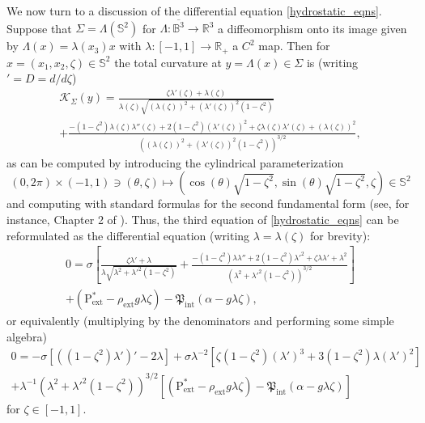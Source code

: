 \documentclass[11pt,reqno]{amsart}
\numberwithin{equation}{section}
\newcommand{\m}{\mathrm}
\def\pfint{\mathfrak{P}_{\m{int}}}
\def\pext{\m{P}_{\m{ext}}}
\def\R{\mathbb{R}}
\begin{document}
We now turn to a discussion of the differential equation \eqref{hydrostatic_eqns}. %
Suppose that $\Sigma = \Lambda(\mathbb{S}^2)$ for $\Lambda : \overline{\mathbb{B}^3} \to \R^3$ a diffeomorphism onto its image given by  $\Lambda(x) = \lambda(x_3) x$  with $\lambda : [-1,1] \to \R_+$   a $C^2$ map.    Then for $x= (x_1,x_2,\zeta) \in \mathbb{S}^2$ the total curvature at $y=\Lambda(x) \in \Sigma$ is (writing $' = D = d/d\zeta$)
\begin{multline}
 \mathscr{K}_{\Sigma}(y) =    \frac{ \zeta \lambda'(\zeta) + \lambda(\zeta)}{\lambda(\zeta)  \sqrt{  (\lambda(\zeta))^2 + (\lambda'(\zeta))^2 (1-\zeta^2)  }}  \\
+ \frac{- (1-\zeta^2) \lambda(\zeta) \lambda''(\zeta) + 2(1-\zeta^2) (\lambda'(\zeta))^2 + \zeta \lambda(\zeta) \lambda'(\zeta) + (\lambda(\zeta))^2}{(  (\lambda(\zeta))^2 + (\lambda'(\zeta))^2 (1-\zeta^2)  )^{3/2}},
\end{multline}
as can be computed by introducing the cylindrical parameterization 
\begin{equation}
 (0,2\pi) \times (-1,1) \ni (\theta,\zeta) \mapsto  (\cos(\theta) \sqrt{1-\zeta^2}, \sin(\theta) \sqrt{1-\zeta^2}, \zeta) \in \mathbb{S}^2
\end{equation}
and computing with standard formulas for the second fundamental form (see, for instance, Chapter 2 of \cite{Spivak_1979}).  Thus, the third equation of \eqref{hydrostatic_eqns} can be reformulated as the differential equation (writing $\lambda = \lambda(\zeta)$ for brevity):  
\begin{multline}
 0 = \sigma \left[ \frac{\zeta \lambda' + \lambda}{\lambda  \sqrt{  \lambda^2 + \lambda'^2 (1-\zeta^2)  }}  
+ \frac{- (1-\zeta^2) \lambda \lambda'' + 2(1-\zeta^2) \lambda'^2 + \zeta \lambda \lambda' + \lambda^2}{(  \lambda^2 + \lambda'^2 (1-\zeta^2)  )^{3/2}} \right] \\
+ (\pext^\ast- \rho_{\m{ext}} g \lambda \zeta) 
- \pfint(\alpha-g \lambda \zeta), 
\end{multline}
or equivalently (multiplying by the denominators and performing some simple algebra)
\begin{multline}\label{curvature_equation_lambda}
0 =     -  \sigma [ ( (1-\zeta^2) \lambda')' - 2\lambda    ] 
+\sigma \lambda^{-2}  \left[    \zeta (1-\zeta^2) (\lambda')^3 + 3(1-\zeta^2) \lambda(\lambda')^2     \right] \\
+ \lambda^{-1}(  \lambda^2 + \lambda'^2 (1-\zeta^2)  )^{3/2} \left[ (\pext^\ast- \rho_{\m{ext}} g \lambda \zeta) -\pfint (\alpha-g \lambda \zeta)   
\right] 
\end{multline}
for $\zeta \in [-1,1]$.
 
\end{document}
